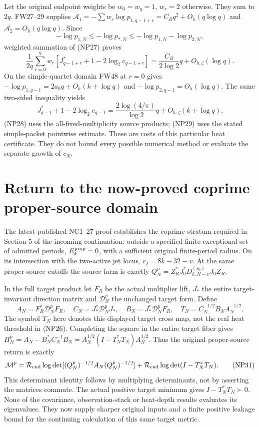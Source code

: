 \documentclass[11pt]{article}
\begin{document}
Let the original endpoint weights be $w_0=w_q=1$, $w_r=2$
otherwise. They sum to $2q$. FW27--29 supplies
$\mathscr A_1=-\sum w_r\log p_{1,q-1+r}=C_Bq^2+O_h(q\log q)$
and $\mathscr A_2=O_h(q\log q)$. Since
\[
 -\log p_{1,N}\le-\log p_{*,N}
       \le-\log p_{1,N}-\log p_{2,N},
\]
weighted summation of (NP27) proves
\[
 \frac1{2q}\sum_{r=0}^qw_r
 [J_{q-1+r}^*+1-2\log_2c_{q-1+r}]
 =\frac{C_B}{2\log2}q+O_{h,\zeta}(\log q).
 \tag{NP28}
\]
On the simple-quartet domain FW48 at $r=0$ gives
$-\log p_{1,q-1}=2a_0q+O_h(k+\log q)$ and
$-\log p_{2,q-1}=O_h(\log q)$. The same two-sided inequality yields
\[
 J_{q-1}^*+1-2\log_2c_{q-1}
 =\frac{2\log(4/\pi)}{\log2}q+O_{h,\zeta}(k+\log q).
 \tag{NP29}
\]
(NP28) uses the all-fixed-multiplicity source products; (NP29) uses
the stated simple-packet pointwise estimate. These are costs of this
particular heat certificate. They do not bound every possible numerical
method or evaluate the separate growth of $c_N$.

\section{Return to the now-proved coprime proper-source domain}
The latest published NC1--27 proof \cite{NC} establishes the
coprime stratum required in Section 5 of the incoming continuation:
outside a specified finite exceptional set of admitted periods,
$E_k^{\rm prop}=0$, with a sufficient original finite-period radius.
On its intersection with the two-active jet locus,
$r_I=8k-32-v$. At the same proper-source cutoffs the source form is
exactly $Q_N^p=Z_R^*J_0^*D_{k,N-v}^{(s_0)}J_0Z_R$.

In the full target product let $F_R$ be the actual multiplier lift,
$J_*$ the entire target-invariant direction matrix and $\mathcal D_N^p$
the unchanged target form. Define
\[
 A_N=F_R^*\mathcal D_N^pF_R,\quad
 C_N=J_*^*\mathcal D_N^pJ_*,\quad
 B_N=J_*^*\mathcal D_N^pF_R,\quad T_N=C_N^{-1/2}B_NA_N^{-1/2}.
 \tag{NP30}
\]
The symbol $T_N$ here denotes this displayed target cross map, not the
real heat threshold in (NP26). Completing the square in the entire
target fiber gives
$H_N^p=A_N-B_N^*C_N^{-1}B_N
=A_N^{1/2}(I-T_N^*T_N)A_N^{1/2}$.
Thus the original proper-source return is exactly
\[
 \mathcal M^p=\mathcal R_{\rm end}\log\det[(Q_N^p)^{-1/2}A_N(Q_N^p)^{-1/2}]
       +\mathcal R_{\rm end}\log\det(I-T_N^*T_N). \tag{NP31}
\]
This determinant identity follows by multiplying determinants, not by
asserting the matrices commute. The actual positive target minimum
gives $I-T_N^*T_N\succ0$. None of the covariance, observation-stack
or heat-depth results evaluates its eigenvalues. They now supply
sharper original inputs and a finite positive leakage bound for the
continuing calculation of this same target metric.
\end{document}

